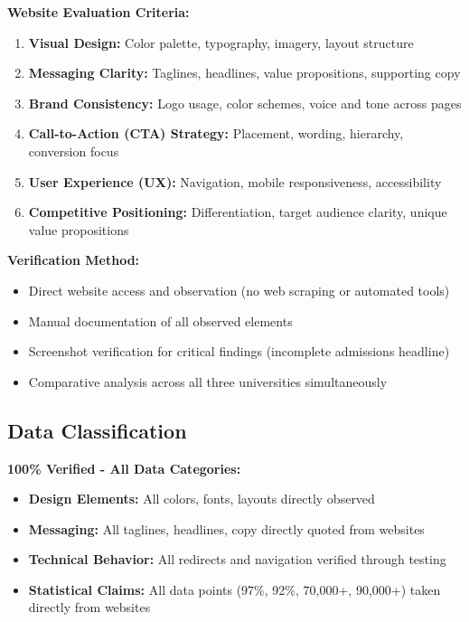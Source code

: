 \documentclass[12pt,letterpaper]{article}
\begin{document}
\textbf{Website Evaluation Criteria:}
\begin{enumerate}[leftmargin=*]
    \item \textbf{Visual Design:} Color palette, typography, imagery, layout structure
    \item \textbf{Messaging Clarity:} Taglines, headlines, value propositions, supporting copy
    \item \textbf{Brand Consistency:} Logo usage, color schemes, voice and tone across pages
    \item \textbf{Call-to-Action (CTA) Strategy:} Placement, wording, hierarchy, conversion focus
    \item \textbf{User Experience (UX):} Navigation, mobile responsiveness, accessibility
    \item \textbf{Competitive Positioning:} Differentiation, target audience clarity, unique value propositions
\end{enumerate}

\textbf{Verification Method:}
\begin{itemize}[leftmargin=*]
    \item Direct website access and observation (no web scraping or automated tools)
    \item Manual documentation of all observed elements
    \item Screenshot verification for critical findings (incomplete admissions headline)
    \item Comparative analysis across all three universities simultaneously
\end{itemize}

\subsection{Data Classification}

\textbf{100\% Verified - All Data Categories:}
\begin{itemize}[leftmargin=*]
    \item \textbf{Design Elements:} All colors, fonts, layouts directly observed
    \item \textbf{Messaging:} All taglines, headlines, copy directly quoted from websites
    \item \textbf{Technical Behavior:} All redirects and navigation verified through testing
    \item \textbf{Statistical Claims:} All data points (97\%, 92\%, 70,000+, 90,000+) taken directly from websites
\end{itemize}
\end{document}
